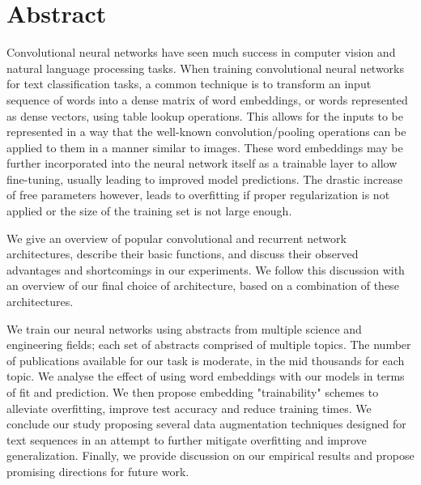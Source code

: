 

\chapter*{Abstract}
Convolutional neural networks have seen much success in computer vision and natural language processing tasks.
When training convolutional neural networks for text classification tasks, a common technique is to transform an input
sequence of words into a dense matrix of word embeddings, or words represented as dense vectors, using table lookup
operations. This allows for the inputs to be represented in a way that the well-known convolution/pooling operations can be applied
to them in a manner similar to images. These word embeddings may be further incorporated into the neural
network itself as a trainable layer to allow fine-tuning, usually leading to improved model predictions.
The drastic increase of free parameters however, leads to overfitting if proper regularization is not applied or the size of
the training set is not large enough.

We give an overview of popular convolutional and recurrent network architectures, describe their basic functions, and discuss their
observed advantages and shortcomings in our experiments. We follow this discussion with an overview of our final choice of architecture,
based on a combination of these architectures.

We train our neural networks using abstracts from multiple science and engineering fields; each set of
abstracts comprised of multiple topics. The number of publications available for our task is moderate, in the mid thousands for each topic.
We analyse the effect of using word embeddings with our models in terms of fit and prediction. We then propose embedding "trainability" schemes
to alleviate overfitting, improve test accuracy and reduce training times. We conclude our study proposing several data augmentation
techniques designed for text sequences in an attempt to further mitigate overfitting and improve generalization.
Finally, we provide discussion on our empirical results and propose promising directions for future work.
